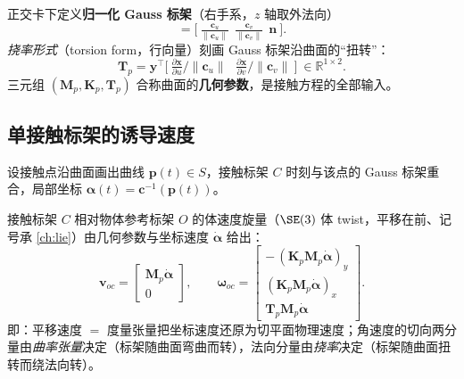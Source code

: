 \begin{definition}\label{def:gp-gauss-frame}
正交卡下定义\textbf{归一化 Gauss 标架}（右手系，$z$ 轴取外法向）
\begin{equation}
  [\,\mathbf{x}\ \ \mathbf{y}\ \ \mathbf{z}\,]=\Big[\ \tfrac{\mathbf{c}_u}{\|\mathbf{c}_u\|}\ \ \tfrac{\mathbf{c}_v}{\|\mathbf{c}_v\|}\ \ \mathbf{n}\ \Big].
  \label{eq:gp-gauss-frame}
\end{equation}
\emph{挠率形式}（torsion form，行向量）刻画 Gauss 标架沿曲面的“扭转”：
\begin{equation}
  \mathbf{T}_p=\mathbf{y}^\top\Big[\ \tfrac{\partial\mathbf{x}}{\partial u}\big/\|\mathbf{c}_u\|\ \ \ \tfrac{\partial\mathbf{x}}{\partial v}\big/\|\mathbf{c}_v\|\ \Big]\ \in\mathbb{R}^{1\times 2}.
  \label{eq:gp-torsion}
\end{equation}
三元组 $(\mathbf{M}_p,\mathbf{K}_p,\mathbf{T}_p)$ 合称曲面的\textbf{几何参数}，是接触方程的全部输入。
\end{definition}

\subsection{单接触标架的诱导速度}
设接触点沿曲面画出曲线 $\mathbf{p}(t)\in S$，接触标架 $C$ 时刻与该点的 Gauss 标架重合，局部坐标 $\boldsymbol{\alpha}(t)=\mathbf{c}^{-1}(\mathbf{p}(t))$。

\begin{lemma}\label{lem:gp-montana-induced}
接触标架 $C$ 相对物体参考标架 $O$ 的体速度旋量（$\SE(3)$ 体 twist，平移在前、记号承 \cref{ch:lie}）由几何参数与坐标速度 $\dot{\boldsymbol{\alpha}}$ 给出：
\begin{equation}
  \mathbf{v}_{oc}=\begin{bmatrix}\mathbf{M}_p\dot{\boldsymbol{\alpha}}\\ 0\end{bmatrix},\qquad
  \boldsymbol{\omega}_{oc}=\begin{bmatrix}-\,(\mathbf{K}_p\mathbf{M}_p\dot{\boldsymbol{\alpha}})_y\\[1pt] (\mathbf{K}_p\mathbf{M}_p\dot{\boldsymbol{\alpha}})_x\\[1pt] \mathbf{T}_p\mathbf{M}_p\dot{\boldsymbol{\alpha}}\end{bmatrix}.
  \label{eq:gp-montana-induced}
\end{equation}
即：平移速度 $=$ 度量张量把坐标速度还原为切平面物理速度；角速度的切向两分量由\emph{曲率张量}决定（标架随曲面弯曲而转），法向分量由\emph{挠率}决定（标架随曲面扭转而绕法向转）。
\end{lemma}


